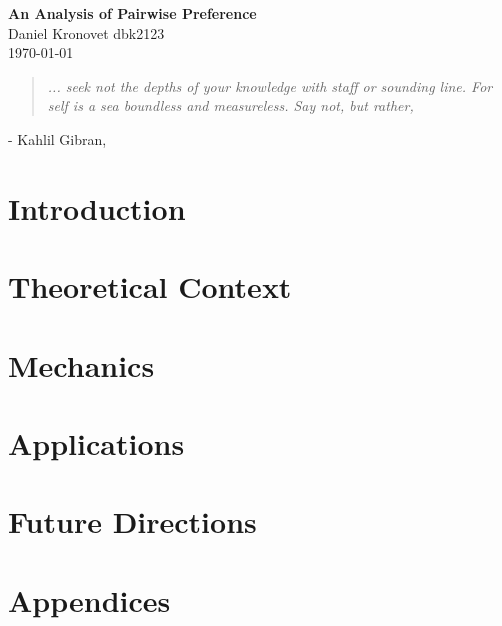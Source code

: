 \documentclass[12pt]{book}
\begin{document}
\begin{center}
  \Large \textbf{An Analysis of Pairwise Preference} \\
  \vspace{0.1in}
  \normalsize Daniel Kronovet dbk2123\\
  \today
\end{center}
  
\begin{center}  
\begin{quotation}
\textit{
	... seek not the depths of your knowledge with staff or sounding line.
	For self is a sea boundless and measureless.
	Say not,  but rather, 
	}
\end{quotation}
- Kahlil Gibran, \textit{} 
\end{center}

\section{Introduction}


\section{Theoretical Context}


\section{Mechanics}


\section{Applications}


\section{Future Directions}


\section{Appendices}


\printbibliography
\end{document}
